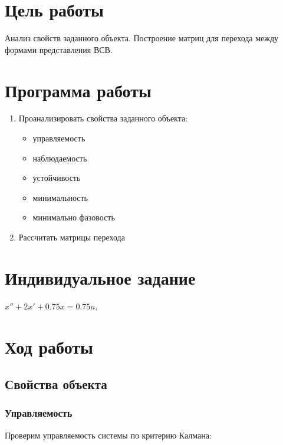



\def\contentsname{Содержание}




\section{Цель работы}

Анализ свойств заданного объекта. Построение матриц для перехода между формами представления ВСВ.

\section{Программа работы}

\begin{enumerate}
	\item Проанализировать свойства заданного объекта:
\begin{itemize}
\item управляемость
\item наблюдаемость
\item устойчивость
\item минимальность
\item минимально фазовость
\end{itemize}
\item Рассчитать матрицы перехода

\end{enumerate}

\section{Индивидуальное задание}

$x''+2x'+0.75x=0.75u$, \\

\section{Ход работы}
\subsection{Свойства объекта}

\subsubsection{Управляемость}

Проверим управляемость системы по критерию Калмана:

